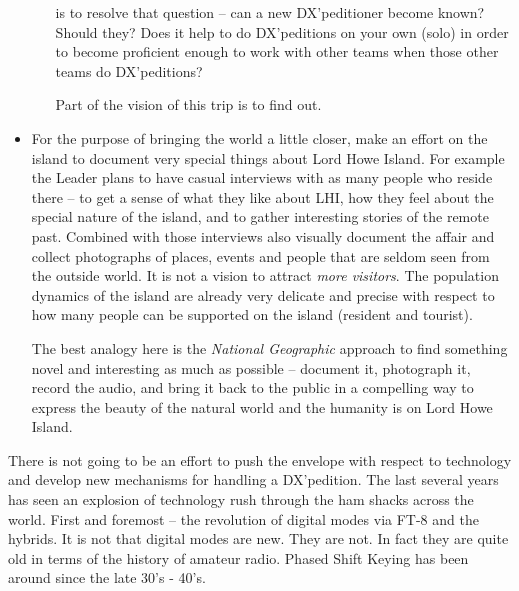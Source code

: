 \documentclass[11pt]{article}
\begin{document}
\begin{itemize}
\begin{enumerate}
is to resolve that question -- can a new DX'peditioner become known?  Should
they?   Does it help to do DX'peditions on your own (solo) in order to
become proficient enough to work with other teams when those other teams
do DX'peditions?
\par
Part of the vision of this trip is to find out.
\end{enumerate}
\item  For the purpose of bringing the world a little closer, make an effort
on the island to document very special things about Lord Howe Island.  For
example the Leader plans to have casual interviews with as many people
who reside there -- to get a sense of what they like about LHI, how
they feel about the special nature of the island, and to gather 
interesting stories of the remote past.   Combined with those interviews
also visually document the affair and collect photographs of places,
events and people that are seldom seen from the outside world.  It is not 
a vision to attract {\textit{more visitors}}.  The population dynamics
of the island are already very delicate and precise with respect to
how many people can be supported on the island (resident and tourist).
\par
The best analogy here is the {\textit{National Geographic}} approach
to find something novel and interesting as much as possible -- document it,
photograph it, record the audio, and bring it back to the public in 
a compelling way to express the beauty of the natural world and the humanity
is on Lord Howe Island.
\end{itemize}

There is not going to be an effort to push the envelope with respect
to technology and develop new mechanisms for handling a DX'pedition.
The last several years has seen an explosion of technology rush
through the ham shacks across the world.   First and foremost -- the 
revolution of digital modes via FT-8 and the hybrids.   It is not that
digital modes are new.  They are not.  In fact they are quite old
in terms of the history of amateur radio.  Phased Shift Keying has
been around since the late 30's - 40's.  
\end{document}
